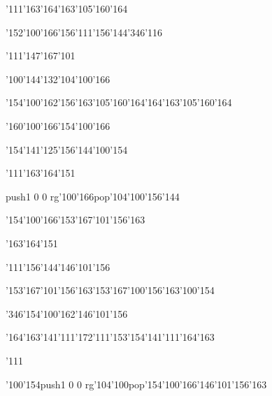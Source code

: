 \null\vfill\ipa\centerline{\enskip\char'111\char'163\enskip\enskip\enskip\enskip\enskip\char'164\char'163\char'105\char'160\char'164}\medskip\centerline{\enskip\enskip\enskip\char'152\char'100\char'166\enskip\char'156\char'111\char'156\char'144\enskip\char'346\char'116}\medskip\centerline{\enskip\char'111\enskip\char'147\char'167\char'101\enskip\enskip\enskip\enskip\enskip\enskip}\medskip\centerline{\enskip\enskip\enskip\enskip\char'100\char'144\char'132\enskip\enskip\enskip\enskip\char'104\char'100\char'166}\medskip\centerline{\enskip\char'154\char'100\char'162\enskip\char'156\char'163\char'105\char'160\char'164\enskip\char'164\char'163\char'105\char'160\char'164\enskip\enskip\enskip}\medskip\centerline{\enskip\enskip\enskip\enskip\enskip\enskip\enskip\char'160\char'100\char'166\enskip\char'154\char'100\char'166\enskip\enskip\enskip}\medskip\centerline{\enskip\enskip\enskip\enskip\enskip\enskip\enskip\enskip\enskip\enskip\char'154\char'141\char'125\char'156\char'144\enskip\char'100\char'154}\medskip\centerline{\enskip\char'111\enskip\char'163\char'164\char'151\enskip\enskip\enskip\enskip\enskip\enskip}\medskip\centerline{\enskip\pdfcolorstack\match push{1 0 0 rg}\char'100\char'166\pdfcolorstack\match pop{}\enskip\enskip\enskip\enskip\enskip\enskip\enskip\enskip\char'104\char'100\char'156\char'144}\medskip\vfill\footline{\hfil\tt\folio\hfil}\eject
\null\vfill\ipa\centerline{\enskip\enskip\enskip\enskip\char'154\char'100\char'166\enskip\char'153\char'167\char'101\char'156\char'163}\medskip\centerline{\enskip\enskip\enskip\enskip\enskip\enskip\enskip\enskip\enskip\enskip\enskip\enskip\enskip\enskip}\medskip\centerline{\enskip\enskip\enskip\char'163\char'164\char'151\enskip\enskip\enskip\enskip\enskip\enskip}\medskip\centerline{\enskip\enskip\enskip\enskip\char'111\char'156\char'144\enskip\enskip\enskip\enskip\char'146\char'101\char'156}\medskip\centerline{\enskip\enskip\enskip\enskip\enskip\char'153\char'167\char'101\char'156\char'163\enskip\char'153\char'167\char'100\char'156\char'163\enskip\char'100\char'154}\medskip\centerline{\enskip\char'346\enskip\char'154\char'100\char'162\enskip\enskip\enskip\enskip\enskip\char'146\char'101\char'156\enskip\enskip\enskip}\medskip\centerline{\enskip\char'164\char'163\char'141\char'111\char'172\enskip\char'111\char'153\enskip\char'154\char'141\char'111\char'164\char'163\enskip\enskip\enskip}\medskip\centerline{\enskip\char'111\enskip\enskip\enskip\enskip\enskip\enskip\enskip\enskip\enskip\enskip}\medskip\centerline{\enskip\char'100\char'154\enskip\pdfcolorstack\match push{1 0 0 rg}\char'104\char'100\pdfcolorstack\match pop{}\enskip\char'154\char'100\char'166\enskip\char'146\char'101\char'156\char'163}\medskip\vfill\footline{\hfil\tt\folio\hfil}\eject

